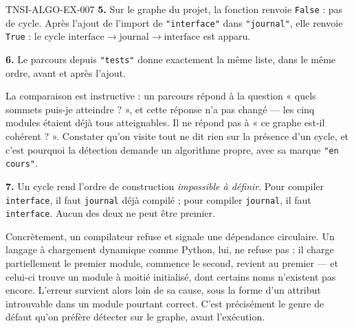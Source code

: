 \begin{corrige}{TNSI-ALGO-EX-007}
\textbf{5.} Sur le graphe du projet, la fonction renvoie \lstinline{False} : pas
de cycle. Après l'ajout de l'import de \lstinline{"interface"} dans
\lstinline{"journal"}, elle renvoie \lstinline{True} : le cycle
$\text{interface}\to\text{journal}\to\text{interface}$ est apparu.

\textbf{6.} Le parcours depuis \lstinline{"tests"} donne exactement la même
liste, dans le même ordre, avant et après l'ajout.

La comparaison est instructive : un parcours répond à la question « quels sommets
puis-je atteindre ? », et cette réponse n'a pas changé — les cinq modules étaient
déjà tous atteignables. Il ne répond pas à « ce graphe est-il cohérent ? ».
Constater qu'on visite tout ne dit rien sur la présence d'un cycle, et c'est
pourquoi la détection demande un algorithme propre, avec sa marque
\lstinline{"en cours"}.

\textbf{7.} Un cycle rend l'ordre de construction \emph{impossible à définir}.
Pour compiler \lstinline{interface}, il faut \lstinline{journal} déjà compilé ;
pour compiler \lstinline{journal}, il faut \lstinline{interface}. Aucun des deux
ne peut être premier.

Concrètement, un compilateur refuse et signale une dépendance circulaire. Un
langage à chargement dynamique comme Python, lui, ne refuse pas : il charge
partiellement le premier module, commence le second, revient au premier — et
celui-ci trouve un module à moitié initialisé, dont certains noms n'existent pas
encore. L'erreur survient alors loin de sa cause, sous la forme d'un attribut
introuvable dans un module pourtant correct. C'est précisément le genre de défaut
qu'on préfère détecter sur le graphe, avant l'exécution.
\end{corrige}
